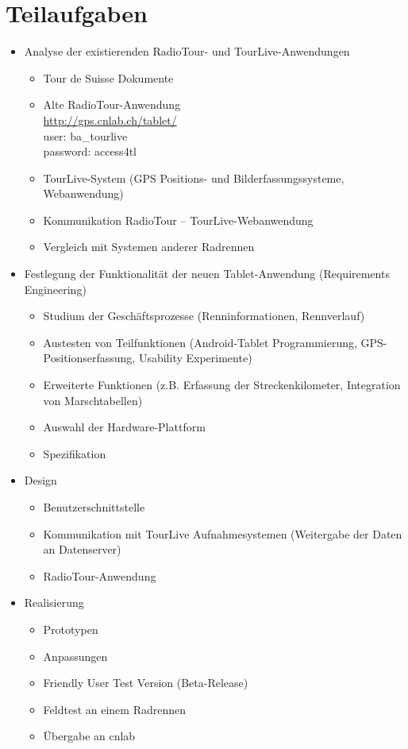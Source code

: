 \section*{Teilaufgaben}
\begin{itemize}
\item Analyse der existierenden RadioTour- und TourLive-Anwendungen
\begin{itemize}
\item Tour de Suisse Dokumente
\item Alte RadioTour-Anwendung\\
\url{http://gps.cnlab.ch/tablet/}\\
user: ba\_tourlive\\
password: access4tl
\item TourLive-System (GPS Positions- und Bilderfassungssysteme, Webanwendung)
\item Kommunikation RadioTour – TourLive-Webanwendung
\item Vergleich mit Systemen anderer Radrennen 
\end{itemize}

\item Festlegung der Funktionalität der neuen Tablet-Anwendung (Requirements Engineering)
\begin{itemize}
\item Studium der Geschäftsprozesse (Renninformationen, Rennverlauf)
\item Austesten von Teilfunktionen (Android-Tablet Programmierung, GPS-Positionserfassung, Usability Experimente)
\item Erweiterte Funktionen (z.B. Erfassung der Streckenkilometer, Integration von Marschtabellen)
\item Auswahl der Hardware-Plattform
\item Spezifikation
\end{itemize}

\item Design
\begin{itemize}
\item Benutzerschnittstelle
\item Kommunikation mit TourLive Aufnahmesystemen (Weitergabe der Daten an Datenserver)
\item RadioTour-Anwendung
\end{itemize}

\item Realisierung
\begin{itemize}
\item Prototypen
\item Anpassungen
\item Friendly User Test Version (Beta-Release)
\item Feldtest an einem Radrennen
\item Übergabe an cnlab
\end{itemize}


\end{itemize}
